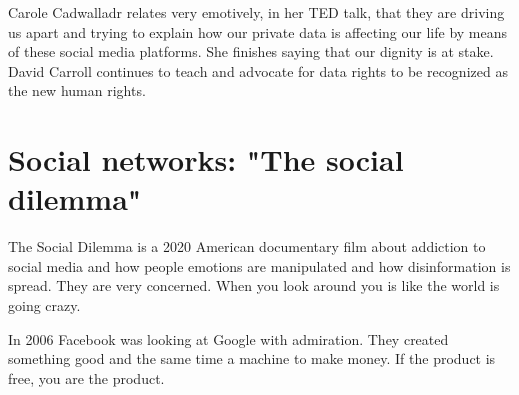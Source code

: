  
   
 
 Carole Cadwalladr relates very emotively, in her TED talk, that they are driving us apart
 and trying to explain how our private data  is affecting our life by means of these social media platforms. 
 She finishes saying that our dignity is at stake. 
 David Carroll continues to teach and advocate for data rights to be recognized as the new human rights. 
 
   
   
   
   
   
   
   
   
   
   
   
   
   
   
   
   
   
   
   
  
        
 \section*{Social networks: "The social dilemma"}
 The Social Dilemma is a 2020 American documentary film about 
 addiction to social media and how people emotions are manipulated  
 and how disinformation is spread.
 They are very concerned. 
 When you look around you is like the world is going crazy. 
  
 In 2006 Facebook was looking at Google with admiration. 
 They created something good and the same time a machine to make money.  
 If the  product is free, you are the product.  
  
